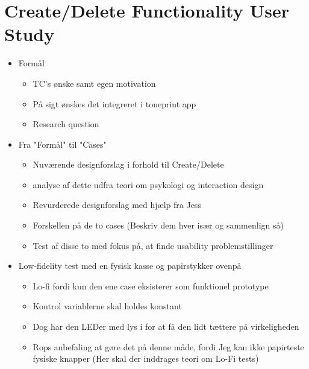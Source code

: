 \chapter{Create/Delete Functionality User Study}
\label{Create_Delete_Test}

\begin{itemize}
	\item Formål
	\begin{itemize}
		\item TC's ønske samt egen motivation
		\item På sigt ønskes det integreret i toneprint app
		\item Research question
	\end{itemize} 


	\item Fra "Formål" til "Cases"
	\begin{itemize}
		\item Nuværende designforslag i forhold til Create/Delete
		\item analyse af dette udfra teori om psykologi og interaction design
		\item Revurderede designforslag med hjælp fra Jess
		\item Forskellen på de to cases (Beskriv dem hver især og sammenlign så)
		\item Test af disse to med fokus på, at finde usability problemstillinger
	\end{itemize}
	
	\item Low-fidelity test med en fysisk kasse og papirstykker ovenpå
	\begin{itemize}
		\item Lo-fi fordi kun den ene case eksisterer som funktionel prototype
		\item Kontrol variablerne skal holdes konstant
		\item Dog har den LEDer med lys i for at få den lidt tættere på virkeligheden
		\item Rops anbefaling at gøre det på denne måde, fordi Jeg kan ikke papirteste fysiske knapper (Her skal der inddrages teori om Lo-Fi tests)
	\end{itemize}
	

\end{itemize}
